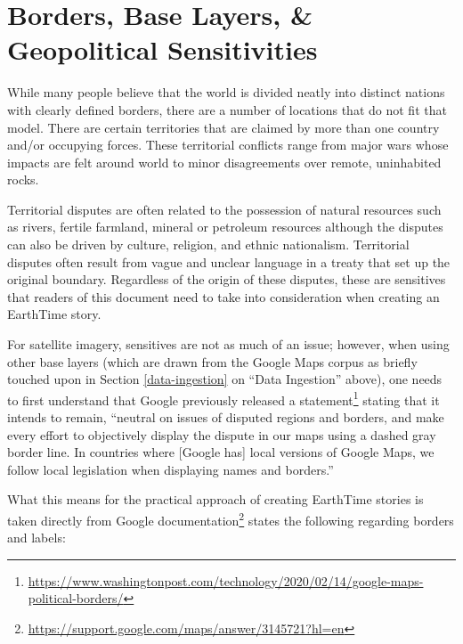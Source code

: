 \documentclass[
]{book}
\renewcommand{\href}[2]{#2\footnote{\url{#1}}}
\begin{document}
\hypertarget{borders-base-layers-geopolitical-sensitivities}{%
\section{Borders, Base Layers, \& Geopolitical Sensitivities}\label{borders-base-layers-geopolitical-sensitivities}}

While many people believe that the world is divided neatly into distinct nations with clearly defined borders, there are a number of locations that do not fit that model. There are certain territories that are claimed by more than one country and/or occupying forces. These territorial conflicts range from major wars whose impacts are felt around world to minor disagreements over remote, uninhabited rocks.

Territorial disputes are often related to the possession of natural resources such as rivers, fertile farmland, mineral or petroleum resources although the disputes can also be driven by culture, religion, and ethnic nationalism. Territorial disputes often result from vague and unclear language in a treaty that set up the original boundary. Regardless of the origin of these disputes, these are sensitives that readers of this document need to take into consideration when creating an EarthTime story.

For satellite imagery, sensitives are not as much of an issue; however, when using other base layers (which are drawn from the Google Maps corpus as briefly touched upon in Section \ref{data-ingestion} on ``Data Ingestion'' above), one needs to first understand that Google previously \href{https://www.washingtonpost.com/technology/2020/02/14/google-maps-political-borders/}{released a statement} stating that it intends to remain, ``neutral on issues of disputed regions and borders, and make every effort to objectively display the dispute in our maps using a dashed gray border line. In countries where {[}Google has{]} local versions of Google Maps, we follow local legislation when displaying names and borders.''

What this means for the practical approach of creating EarthTime stories is taken directly from \href{https://support.google.com/maps/answer/3145721?hl=en}{Google documentation} states the following regarding borders and labels:
\end{document}
